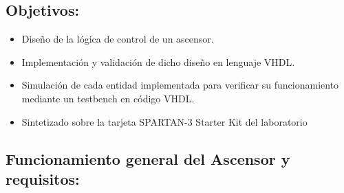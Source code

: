﻿

\subsection{Objetivos:}
    \begin{itemize}
        \item Diseño de la lógica de control de un ascensor.
        \item Implementación y validación de dicho diseño en lenguaje VHDL.
        \item Simulación de cada entidad implementada para verificar su funcionamiento mediante un testbench en código VHDL.
        \item Sintetizado sobre la tarjeta SPARTAN-3 Starter Kit del laboratorio
    \end{itemize}
    
\subsection{Funcionamiento general del Ascensor y requisitos:}

